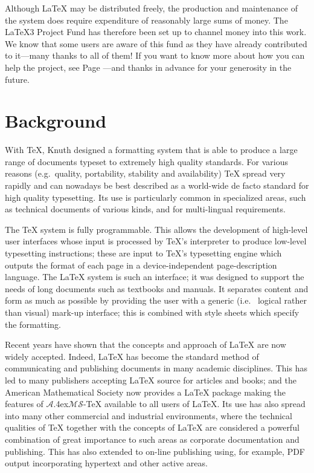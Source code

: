 \documentclass[a4paper]{article}
\newcommand{\eg}{e.g.~}
\newcommand{\ie}{i.e.~}
\newcommand{\PDF}{{\sc PDF}}
\newcommand{\AmSTeX}{$\mathcal A$\lower.4ex\hbox{$\!\mathcal
                                            M\!$}$\mathcal S$-\TeX}
\begin{document}
Although \LaTeX{} may be distributed freely, the production and
maintenance of the system does require expenditure of reasonably large
sums of money.  The \LaTeX3 Project Fund has therefore been set up to
channel money into this work.  We know that some users are
aware of this fund as they have already contributed to it---many
thanks to all of them!  If you want to know more about how you can
help the project, see Page \pageref{fund}---and thanks in advance for
your generosity in the future.


\section{Background}

With \TeX{}, Knuth designed a formatting system that is able to
produce a large range of documents typeset to extremely high quality
standards. For various reasons (\eg quality, portability, stability
and availability) \TeX{} spread very rapidly and can nowadays be best
described as a world-wide de facto standard for high quality
typesetting. Its use is particularly common in specialized areas, such
as technical documents of various kinds, and for multi-lingual
requirements.

The \TeX{} system is fully programmable. This allows the development
of high-level user interfaces whose input is processed by \TeX{}'s
interpreter to produce low-level typesetting instructions; these are
input to \TeX{}'s typesetting engine which outputs the format of each
page in a device-independent page-description language.  The \LaTeX{}
system is such an interface; it was designed to support the needs of
long documents such as textbooks and manuals. It separates content and
form as much as possible by providing the user with a generic (\ie
logical rather than visual) mark-up interface; this is combined with
style sheets which specify the formatting.

Recent years have shown that the concepts and approach of \LaTeX{} are
now widely accepted. Indeed, \LaTeX{} has become the standard method
of communicating and publishing documents in many academic
disciplines.  This has led to many publishers accepting \LaTeX{}
source for articles and books; and the American Mathematical Society
now provides a \LaTeX{} package making the features of \AmSTeX{}
available to all users of \LaTeX{}.  Its use has also spread into many
other commercial and industrial environments, where the technical
qualities of \TeX{} together with the concepts of \LaTeX{} are
considered a powerful combination of great importance to such areas as
corporate documentation and publishing.  This has also extended to
on-line publishing using, for example, \PDF{} output incorporating
hypertext and other active areas.
\end{document}
